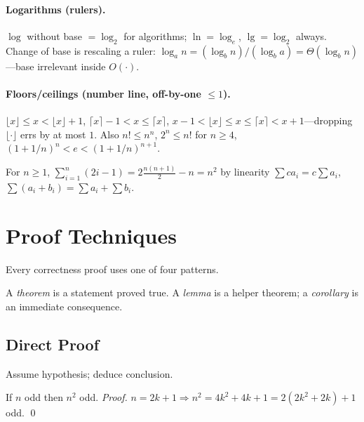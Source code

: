 \paragraph{Logarithms (rulers).} $\log$ without base $=\log_2$ for algorithms; $\ln=\log_e$, $\lg=\log_2$ always. Change of base is rescaling a ruler: $\log_a n=(\log_b n)/(\log_b a)=\Theta(\log_b n)$---base irrelevant inside $O(\cdot)$.
\paragraph{Floors/ceilings (number line, off-by-one $\le1$).}
\begin{center}
\end{center}
$\lfloor x\rfloor\le x<\lfloor x\rfloor+1$, $\lceil x\rceil-1<x\le\lceil x\rceil$, $x-1<\lfloor x\rfloor\le x\le\lceil x\rceil<x+1$---dropping $\lfloor\cdot\rfloor$ errs by at most $1$.
Also $n!\le n^n$, $2^n\le n!$ for $n\ge4$, $(1+1/n)^n<e<(1+1/n)^{n+1}$.
\begin{example}
For $n\ge1$, $\sum_{i=1}^{n}(2i-1)=2\frac{n(n+1)}2-n=n^2$ by linearity $\sum c a_i=c\sum a_i$, $\sum(a_i+b_i)=\sum a_i+\sum b_i$.
\end{example}

\section{Proof Techniques}
\label{sec:proofs}
Every correctness proof uses one of four patterns.
\begin{definition}
A \emph{theorem} is a statement proved true. A \emph{lemma} is a helper theorem; a \emph{corollary} is an immediate consequence.
\end{definition}
\subsection{Direct Proof} Assume hypothesis; deduce conclusion.
\begin{example} If $n$ odd then $n^2$ odd. \emph{Proof.} $n=2k+1\Rightarrow n^2=4k^2+4k+1=2(2k^2+2k)+1$ odd. \qed \end{example}
